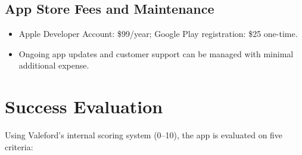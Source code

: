 \documentclass[11pt]{article}
\begin{document}
\subsection{App Store Fees and Maintenance}
\begin{itemize}[noitemsep]
    \item Apple Developer Account: \$99/year; Google Play registration: \$25 one-time.
    \item Ongoing app updates and customer support can be managed with minimal additional expense.
\end{itemize}

\section{Success Evaluation}

Using Valeford’s internal scoring system (0--10), the app is evaluated on five criteria:
\end{document}
